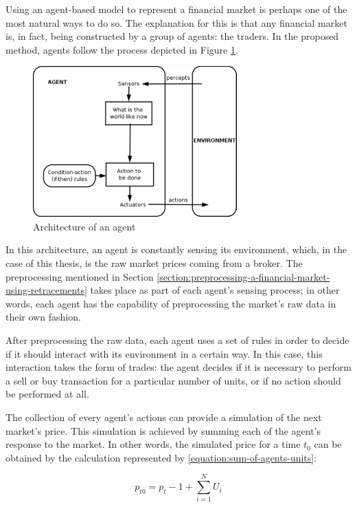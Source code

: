 Using an agent-based model to represent a financial market is perhaps one of the
most natural ways to do so. The explanation for this is that any financial
market is, in fact, being constructed by a group of agents: the traders. In the
proposed method, agents follow the process depicted in Figure
\ref{figure:agent-architecture}.

\begin{figure}
\centering
\includegraphics[width=0.7\textwidth]{img/agent-architecture.png}
\caption{Architecture of an agent}
\label{figure:agent-architecture}
\end{figure}

In this architecture, an agent is constantly sensing its environment, which, in
the case of this thesis, is the raw market prices coming from a broker. The
preprocessing mentioned in Section
\ref{section:preprocessing-a-financial-market-using-retracements} takes place as
part of each agent's sensing process; in other words, each agent has the
capability of preprocessing the market's raw data in their own fashion.

After preprocessing the raw data, each agent uses a set of rules in order to
decide if it should interact with its environment in a certain way. In this
case, this interaction takes the form of trades: the agent decides if it is
necessary to perform a sell or buy transaction for a particular number of units,
or if no action should be performed at all.

The collection of every agent's actions can provide a simulation of the next
market's price. This simulation is achieved by summing each of the agent's
response to the market. In other words, the simulated price for a time $t_0$ can
be obtained by the calculation represented by \ref{equation:sum-of-agents-units}:

\begin{equation}
  \label{equation:sum-of-agents-units}
  p_{t0} = p_t-1 + \sum_{i=1}^{N} U_i
\end{equation}

